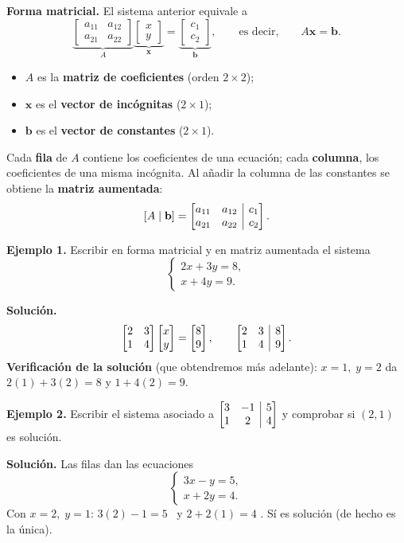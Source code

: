 \documentclass[12pt, letterpaper]{article}
\makeatletter
\newcommand{\mwmat}[1]{\ensuremath{\begin{bmatrix}#1\end{bmatrix}}}
\newcommand{\mwaug}[2]{\ensuremath{\left[\begin{array}{@{}#1@{}}#2\end{array}\right]}}
\makeatother
\begin{document}
\begin{cuadroteoria}
  \small
  \textbf{Forma matricial.} El sistema anterior equivale a
  \[
    \underbrace{\mwmat{a_{11}&a_{12}\\a_{21}&a_{22}}}_{A}
    \underbrace{\mwmat{x\\y}}_{\mathbf{x}}
    =
    \underbrace{\mwmat{c_1\\c_2}}_{\mathbf{b}},
    \qquad\text{es decir,}\qquad A\mathbf{x}=\mathbf{b}.
  \]
  \begin{itemize}[leftmargin=1.2em, nosep]
    \item $A$ es la \textbf{matriz de coeficientes} (orden $2\times2$);
    \item $\mathbf{x}$ es el \textbf{vector de incógnitas} ($2\times1$);
    \item $\mathbf{b}$ es el \textbf{vector de constantes} ($2\times1$).
  \end{itemize}
\end{cuadroteoria}

Cada \textbf{fila} de $A$ contiene los coeficientes de una ecuación; cada
\textbf{columna}, los coeficientes de una misma incógnita. Al añadir la
columna de las constantes se obtiene la \textbf{matriz aumentada}:
\[
  \left[A\mid\mathbf{b}\right]
  =
  \mwaug{cc|c}{a_{11}&a_{12}&c_1\\ a_{21}&a_{22}&c_2}.
\]

\begin{cuadrosolucion}
  \small
  \textbf{Ejemplo 1.} Escribir en forma matricial y en matriz aumentada el
  sistema
  \[
    \begin{cases}
      2x+3y=8,\\
      x+4y=9.
    \end{cases}
  \]

  \medskip
  \textbf{Solución.}
  \[
    \mwmat{2&3\\1&4}\mwmat{x\\y}=\mwmat{8\\9},
    \qquad
    \mwaug{cc|c}{2&3&8\\1&4&9}.
  \]
  \textbf{Verificación de la solución} (que obtendremos más adelante):
  $x=1,\;y=2$ da $2(1)+3(2)=8$ y $1+4(2)=9$. \checkmark
\end{cuadrosolucion}

\begin{cuadrosolucion}
  \small
  \textbf{Ejemplo 2.} Escribir el sistema asociado a
  $\mwaug{cc|c}{3&-1&5\\1&2&4}$ y comprobar si $(2,1)$ es solución.

  \medskip
  \textbf{Solución.} Las filas dan las ecuaciones
  \[
    \begin{cases}
      3x-y=5,\\
      x+2y=4.
    \end{cases}
  \]
  Con $x=2,\;y=1$: $3(2)-1=5$ \checkmark\ y $2+2(1)=4$ \checkmark. Sí es
  solución (de hecho es la única).
\end{cuadrosolucion}
\end{document}
